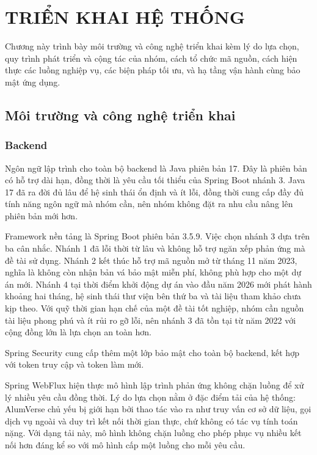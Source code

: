 \documentclass[12pt,a4paper,oneside]{report}
\begin{document}
\chapter{TRIỂN KHAI HỆ THỐNG}

Chương này trình bày môi trường và công nghệ triển khai kèm lý do lựa chọn, quy trình phát triển và cộng tác của nhóm, cách tổ chức mã nguồn, cách hiện thực các luồng nghiệp vụ, các biện pháp tối ưu, và hạ tầng vận hành cùng bảo mật ứng dụng.

\section{Môi trường và công nghệ triển khai}

\subsection{Backend}

Ngôn ngữ lập trình cho toàn bộ backend là Java phiên bản 17. Đây là phiên bản có hỗ trợ dài hạn, đồng thời là yêu cầu tối thiểu của Spring Boot nhánh 3. Java 17 đã ra đời đủ lâu để hệ sinh thái ổn định và ít lỗi, đồng thời cung cấp đầy đủ tính năng ngôn ngữ mà nhóm cần, nên nhóm không đặt ra nhu cầu nâng lên phiên bản mới hơn.

Framework nền tảng là Spring Boot phiên bản 3.5.9. Việc chọn nhánh 3 dựa trên ba cân nhắc. Nhánh 1 đã lỗi thời từ lâu và không hỗ trợ ngăn xếp phản ứng mà đề tài sử dụng. Nhánh 2 kết thúc hỗ trợ mã nguồn mở từ tháng 11 năm 2023, nghĩa là không còn nhận bản vá bảo mật miễn phí, không phù hợp cho một dự án mới. Nhánh 4 tại thời điểm khởi động dự án vào đầu năm 2026 mới phát hành khoảng hai tháng, hệ sinh thái thư viện bên thứ ba và tài liệu tham khảo chưa kịp theo. Với quỹ thời gian hạn chế của một đề tài tốt nghiệp, nhóm cần nguồn tài liệu phong phú và ít rủi ro gỡ lỗi, nên nhánh 3 đã tồn tại từ năm 2022 với cộng đồng lớn là lựa chọn an toàn hơn.

Spring Security cung cấp thêm một lớp bảo mật cho toàn bộ backend, kết hợp với token truy cập và token làm mới.

Spring WebFlux hiện thực mô hình lập trình phản ứng không chặn luồng để xử lý nhiều yêu cầu đồng thời. Lý do lựa chọn nằm ở đặc điểm tải của hệ thống: AlumVerse chủ yếu bị giới hạn bởi thao tác vào ra như truy vấn cơ sở dữ liệu, gọi dịch vụ ngoài và duy trì kết nối thời gian thực, chứ không có tác vụ tính toán nặng. Với dạng tải này, mô hình không chặn luồng cho phép phục vụ nhiều kết nối hơn đáng kể so với mô hình cấp một luồng cho mỗi yêu cầu.
\end{document}
